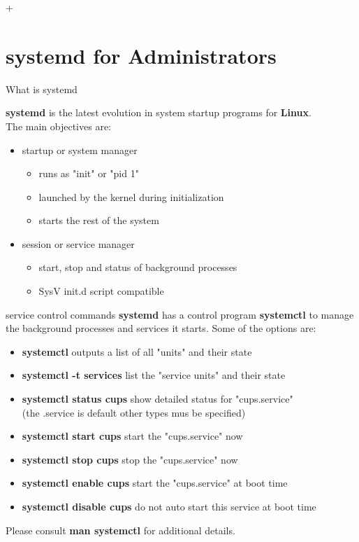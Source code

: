 +\section{systemd for Administrators}


\begin{frame}
   {What is systemd}

	\textbf{systemd} is the latest evolution in 
	system startup programs for \textbf{Linux}. \\
		The main objectives are: 
	\begin{itemize}
		\item startup or system manager 
			\begin{itemize}
			\item runs as "init" or "pid 1"
			\item launched by the kernel during initialization
			\item starts the rest of the system
			\end{itemize}
		\item session or service manager 
			\begin{itemize}
			\item start, stop and status of background processes
			\item SysV init.d script compatible
			\end{itemize}
	\end{itemize}

\end{frame}

\cprotect\note{

}

\begin{frame}
	{service control commands}
	\textbf{systemd} has a control program \textbf{systemctl} to manage
	the background processes and services it starts. Some of the options are: 
	\begin{itemize}
	\item \textbf{systemctl}  outputs a list of all "units" and their state
	\item \textbf{systemctl -t services} list the "service units" and their state
	\item \textbf{systemctl status cups} show detailed status for "cups.service" \\
		(the .service is default other types mus be specified)
	\item \textbf{systemctl start cups} start the "cups.service" now 
	\item \textbf{systemctl stop cups} stop the "cups.service" now
	\item \textbf{systemctl enable cups} start the "cups.service" at boot time
	\item \textbf{systemctl disable cups} do not auto start this service at boot time
	\end{itemize}
	Please consult \textbf{man systemctl} for additional details. 
\end{frame}

